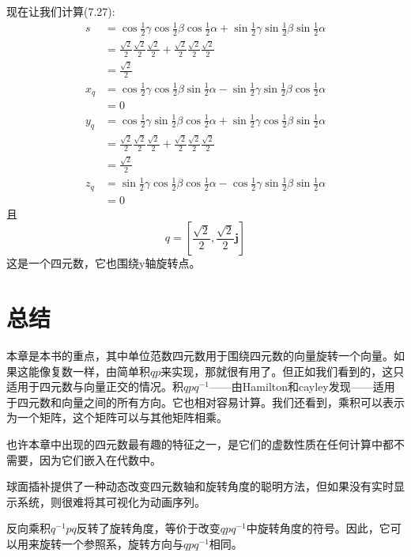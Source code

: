 现在让我们计算(7.27):
$$
\begin{aligned}
s & =\cos \frac{1}{2} \gamma \cos \frac{1}{2} \beta \cos \frac{1}{2} \alpha+\sin \frac{1}{2} \gamma \sin \frac{1}{2} \beta \sin \frac{1}{2} \alpha \\
& =\frac{\sqrt{2}}{2} \frac{\sqrt{2}}{2} \frac{\sqrt{2}}{2}+\frac{\sqrt{2}}{2} \frac{\sqrt{2}}{2} \frac{\sqrt{2}}{2} \\
& =\frac{\sqrt{2}}{2} \\
x_{q} & =\cos \frac{1}{2} \gamma \cos \frac{1}{2} \beta \sin \frac{1}{2} \alpha-\sin \frac{1}{2} \gamma \sin \frac{1}{2} \beta \cos \frac{1}{2} \alpha \\
& =0 \\
y_{q} & =\cos \frac{1}{2} \gamma \sin \frac{1}{2} \beta \cos \frac{1}{2} \alpha+\sin \frac{1}{2} \gamma \cos \frac{1}{2} \beta \sin \frac{1}{2} \alpha \\
& =\frac{\sqrt{2}}{2} \frac{\sqrt{2}}{2} \frac{\sqrt{2}}{2}+\frac{\sqrt{2}}{2} \frac{\sqrt{2}}{2} \frac{\sqrt{2}}{2} \\
& =\frac{\sqrt{2}}{2} \\
z_{q} & =\sin \frac{1}{2} \gamma \cos \frac{1}{2} \beta \cos \frac{1}{2} \alpha-\cos \frac{1}{2} \gamma \sin \frac{1}{2} \beta \sin \frac{1}{2} \alpha \\
& =0
\end{aligned}
$$
且
$$
q=\left[\frac{\sqrt{2}}{2}, \frac{\sqrt{2}}{2} \mathbf{j}\right]
$$
这是一个四元数，它也围绕y轴旋转点。

\section{总结}
本章是本书的重点，其中单位范数四元数用于围绕四元数的向量旋转一个向量。如果这能像复数一样，由简单积$q p$来实现，那就很有用了。但正如我们看到的，这只适用于四元数与向量正交的情况。积$q p q^{-1}$——由Hamilton和cayley发现——适用于四元数和向量之间的所有方向。它也相对容易计算。我们还看到，乘积可以表示为一个矩阵，这个矩阵可以与其他矩阵相乘。

也许本章中出现的四元数最有趣的特征之一，是它们的虚数性质在任何计算中都不需要，因为它们嵌入在代数中。

球面插补提供了一种动态改变四元数轴和旋转角度的聪明方法，但如果没有实时显示系统，则很难将其可视化为动画序列。

反向乘积$q^{-1} p q$反转了旋转角度，等价于改变$q p q^{-1}$中旋转角度的符号。因此，它可以用来旋转一个参照系，旋转方向与$q p q^{-1}$相同。

